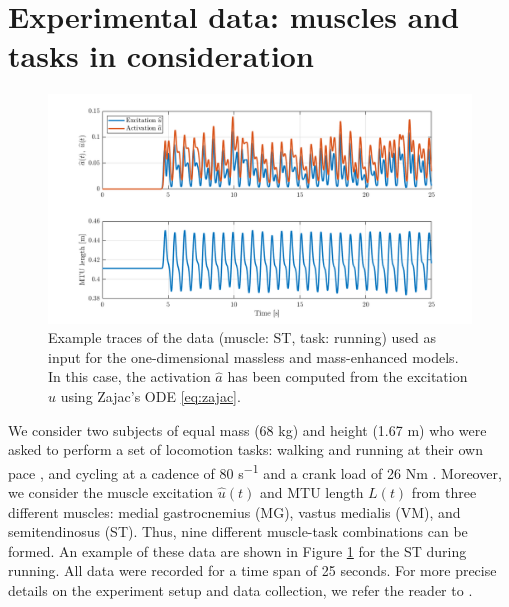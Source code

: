 \documentclass{sfuthesis}
\numberwithin{equation}{section}
\numberwithin{figure}{chapter}
\numberwithin{table}{chapter}
\theoremstyle{definition}
\begin{document}
\section{Experimental data: muscles and tasks in consideration} \label{sec:experimental_data}

\begin{figure}
    \centering
    \includegraphics[width=\textwidth]{example-traces-activation-mtulength.png}
    \caption{Example traces of the data (muscle: ST, task: running) used as input for the one-dimensional massless and mass-enhanced models. In this case, the activation $\widehat{a}$ has been computed from the excitation $\widehat{u}$ using Zajac's ODE \eqref{eq:zajac}.}
    \label{fig:traces_act_mtu_length}
\end{figure}

We consider two subjects of equal mass (68 kg) and height (1.67 m) who were asked to perform a set of locomotion tasks: walking and running at their own pace \cite{EvanThesis}, and cycling at a cadence of 80 \si{s^{-1}} and a crank load of 26 N\hspace{0.1em}m \cite{Dick2016}. Moreover, we consider the muscle excitation $\widehat{u}(t)$ and MTU length $L(t)$ from three different muscles: medial gastrocnemius (MG), vastus medialis (VM), and semitendinosus (ST). Thus, nine different muscle-task combinations can be formed. An example of these data are shown in Figure \ref{fig:traces_act_mtu_length} for the ST during running. All data were recorded for a time span of 25 seconds. For more precise details on the experiment setup and data collection, we refer the reader to \cite{EvanThesis}.

\end{document}
